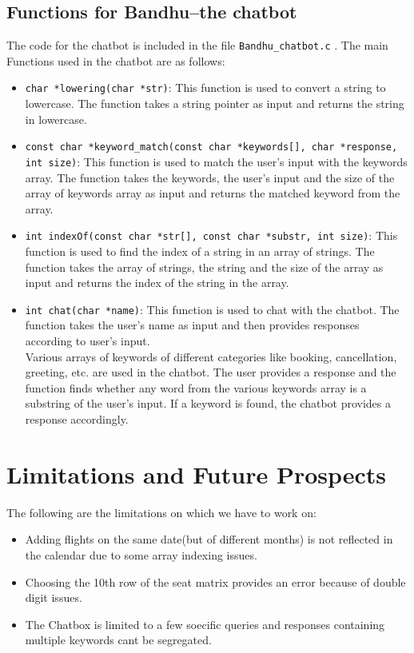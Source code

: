 \documentclass[a4paper]{scrartcl}
\begin{document}
\subsection{Functions for Bandhu--the chatbot}
The code for the chatbot is included in the file  \texttt{Bandhu\_chatbot.c} . The main Functions used in the chatbot are as follows: 

\noindent
    
\begin{itemize}
    \item \texttt{char *lowering(char *str)}: This function is used to convert a string to lowercase. The function takes a string pointer as input and returns the string in lowercase.
    \item \texttt{const char *keyword\_match(const char *keywords[], char *response, int size)}: This function is used to match the user's input with the keywords array. The function takes the keywords, the user's input and the size of the array of keywords array as input and returns the matched keyword from the array.
    \item \texttt{int indexOf(const char *str[], const char *substr, int size)}: This function is used to find the index of a string in an array of strings. The function takes the array of strings, the string and the size of the array as input and returns the index of the string in the array.
    \item \texttt{int chat(char *name)}: This function is used to chat with the chatbot. The function takes the user's name as input and then provides responses according to user's input.\\
    Various arrays of keywords of different categories like booking, cancellation, greeting, etc. are used in the chatbot. The user provides a response and the function finds whether any word from the various keywords array is a substring of the user's input. If a keyword is found, the chatbot provides a response accordingly.
\end{itemize}
        

\section{Limitations and Future Prospects}
The following are the limitations on which we have to work on:
\begin{itemize}
    \item Adding flights on the same date(but of different months) is not reflected in the calendar due to some array indexing issues.
    \item Choosing the 10th row of the seat matrix provides an error because of double digit issues.
    \item The Chatbox is limited to a few soecific queries and responses containing multiple keywords cant be segregated.
\end{itemize}
\end{document}
